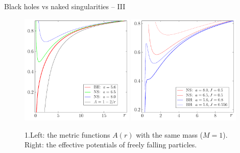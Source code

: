 \documentclass[12pt,aspectratio=139, slidestop,notes=hide]{beamer}
\begin{document}
\begin{frame}
{\centerline {Black holes vs naked singularities -- III\quad}}

\begin{figure}[]
\begin{center}
\includegraphics [width=0.483\textwidth]{Figure1}
\includegraphics [width=0.483\textwidth]{Figure2}
\end{center}\vspace{-1ex}
\caption{1.\;Left: the metric functions $A(r)$ with the same mass ($M=1$). Right: the effective potentials of freely falling  particles.}
\label{fig1}
\end{figure}

\end{frame}
\end{document}
